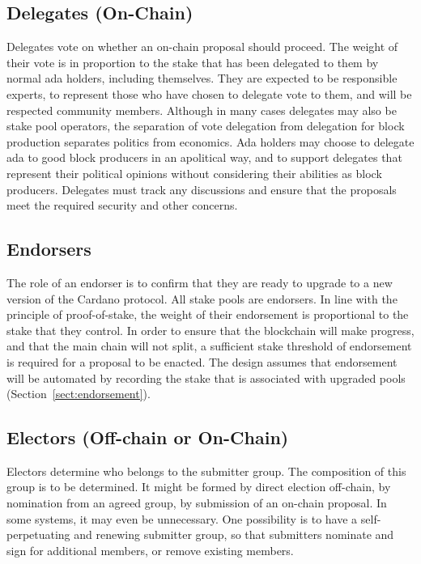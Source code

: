 \subsection{Delegates (On-Chain)}

Delegates vote on whether an on-chain proposal should proceed.  The weight of
their vote is in proportion to the stake that has been delegated to them by
normal ada holders, including themselves.  They are expected to be responsible
experts, to represent those who have chosen to delegate vote to them, and will
be respected community members.  Although in many cases delegates may also be
stake pool operators, the separation of vote delegation from delegation for
block production separates politics from economics.  Ada holders may choose to
delegate ada to good block producers in an apolitical way, and to support
delegates that represent their political opinions without considering their abilities as
block producers.  Delegates must track any discussions and ensure that the proposals meet the required
security and other concerns.

\subsection{Endorsers}

The role of an endorser is to confirm that they are ready to upgrade to a new
version of the Cardano protocol.  All stake pools are endorsers.  In line with
the principle of proof-of-stake, the weight of their endorsement is proportional
to the stake that they control.  In order to ensure that the blockchain will
make progress, and that the main chain will not split, a sufficient stake
threshold of endorsement is required for a proposal to be enacted.
The design assumes that endorsement will be automated by recording the stake that
is associated with upgraded pools (Section~\ref{sect:endorsement}).


\subsection{Electors (Off-chain or On-Chain)}

Electors determine who belongs to the submitter group.  The composition of this group is to be determined.  It might be formed by direct election off-chain, by
nomination from an agreed group, by submission of an on-chain proposal.  In some systems, it may even be unnecessary.
One possibility is to have a self-perpetuating and renewing submitter group, so that submitters nominate and sign for additional members, or remove existing members.
